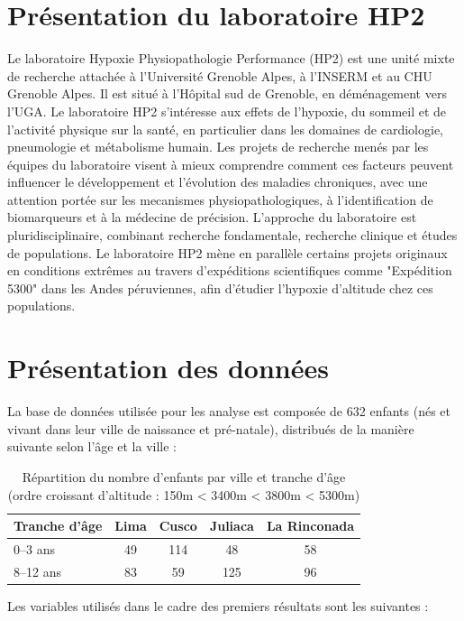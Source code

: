 \documentclass[12pt,a4paper]{article}
\begin{document}
\section{Présentation du laboratoire HP2}
Le laboratoire Hypoxie Physiopathologie Performance (HP2) est une unité mixte de recherche attachée à l'Université Grenoble Alpes, à l'INSERM et au CHU Grenoble Alpes. Il est situé à l'Hôpital sud de Grenoble, en déménagement vers l'UGA.
Le laboratoire HP2 s'intéresse aux effets de l'hypoxie, du sommeil et de l'activité physique sur la santé, en particulier dans les domaines de cardiologie, pneumologie et métabolisme humain. Les projets de recherche menés par les équipes du laboratoire visent à mieux comprendre comment ces facteurs peuvent influencer le développement et l'évolution des maladies chroniques, avec une attention portée sur les mecanismes physiopathologiques, à l'identification de biomarqueurs et à la médecine de précision.
L'approche du laboratoire est pluridisciplinaire, combinant recherche fondamentale, recherche clinique et études de populations. Le laboratoire HP2 mène en parallèle certains projets originaux en conditions extrêmes au travers d'expéditions scientifiques comme "Expédition 5300" dans les Andes péruviennes, afin d'étudier l'hypoxie d'altitude chez ces populations.

\section{Présentation des données}

La base de données utilisée pour les analyse est composée de 632 enfants (nés et vivant dans leur ville de naissance et pré-natale), distribués de la manière suivante selon l'âge et la ville :

\begin{table}[h!]
\centering
\begin{tabular}{lcccc}
\hline
\textbf{Tranche d'âge} & \textbf{Lima} & \textbf{Cusco} & \textbf{Juliaca} & \textbf{La Rinconada} \\
\hline
0--3 ans   & 49  & 114 & 48  & 58 \\
8--12 ans  & 83  & 59  & 125 & 96 \\
\hline
\end{tabular}
\caption{Répartition du nombre d'enfants par ville et tranche d'âge (ordre croissant d'altitude : 150m < 3400m < 3800m < 5300m)}
\end{table}

Les variables utilisés dans le cadre des premiers résultats sont les suivantes :
\end{document}
